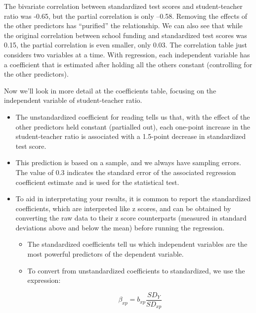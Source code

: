 \documentclass[
  letterpaper,
  DIV=11,
  numbers=noendperiod]{scrreprt}
\begin{document}
The bivariate correlation between standardized test scores and
student-teacher ratio was -0.65, but the partial correlation is only
--0.58. Removing the effects of the other predictors has ``purified''
the relationship. We can also see that while the original correlation
between school funding and standardized test scores was 0.15, the
partial correlation is even smaller, only 0.03. The correlation table
just considers two variables at a time. With regression, each
independent variable has a coefficient that is estimated after holding
all the others constant (controlling for the other predictors). \,\,

Now we'll look in more detail at the coefficients table, focusing on the
independent variable of student-teacher ratio.

\begin{itemize}
\item
  The unstandardized coefficient for reading tells us that, with the
  effect of the other predictors held constant (partialled out), each
  one-point increase in the student-teacher ratio is associated with a
  1.5-point decrease in standardized test score.
\item
  This prediction is based on a sample, and we always have sampling
  errors. The value of 0.3 indicates the standard error of the
  associated regression coefficient estimate and is used for the
  statistical test.
\item
  To aid in interpretating your results, it is common to report the
  standardized coefficients, which are interpreted like z scores, and
  can be obtained by converting the raw data to their z score
  counterparts (measured in standard deviations above and below the
  mean) before running the regression.

  \begin{itemize}
  \item
    The standardized coefficients tell us which independent variables
    are the most powerful predictors of the dependent variable.
  \item
    To convert from unstandardized coefficients to standardized, we use
    the expression:

    \[
    \beta_{xp} = b_{xp}\frac{SD_Y}{SD_{xp}}
    \]


\end{itemize}
\end{itemize}
\end{document}
